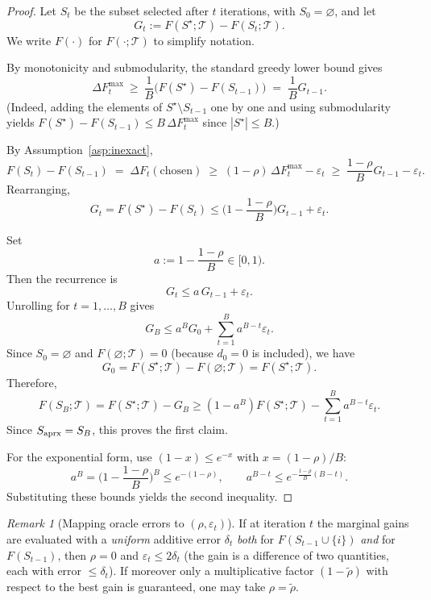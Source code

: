 \documentclass[accepted]{uai2026}
\theoremstyle{plain}
\theoremstyle{definition}
\theoremstyle{remark}
\newtheorem{remark}[theorem]{Remark}
\begin{document}
\begin{proof}
Let $S_t$ be the subset selected after $t$ iterations, with $S_0=\varnothing$, and let
\[
G_t := F(S^\star;\mathcal T)-F(S_t;\mathcal T).
\]
We write $F(\cdot)$ for $F(\cdot;\mathcal T)$ to simplify notation.

By monotonicity and submodularity, the standard greedy lower bound gives
\[
\Delta F_t^{\max}\ \ge\ \frac{1}{B}\big(F(S^\star)-F(S_{t-1})\big)
\;=\;\frac{1}{B}G_{t-1}.
\]
(Indeed, adding the elements of $S^\star\setminus S_{t-1}$ one by one and using submodularity yields
$F(S^\star)-F(S_{t-1})\le B\,\Delta F_t^{\max}$ since $|S^\star|\le B$.)

By Assumption~\ref{asp:inexact},
\[
F(S_t)-F(S_{t-1})
\;=\;\Delta F_t(\text{chosen})
\;\ge\; (1-\rho)\,\Delta F_t^{\max}-\varepsilon_t
\;\ge\; \frac{1-\rho}{B}G_{t-1}-\varepsilon_t.
\]
Rearranging,
\[
G_t
=F(S^\star)-F(S_t)
\le \Big(1-\frac{1-\rho}{B}\Big)G_{t-1}+\varepsilon_t.
\]

Set
\[
a:=1-\frac{1-\rho}{B}\in[0,1).
\]
Then the recurrence is
\[
G_t\le a\,G_{t-1}+\varepsilon_t.
\]
Unrolling for $t=1,\dots,B$ gives
\[
G_B\le a^B G_0+\sum_{t=1}^B a^{B-t}\varepsilon_t.
\]
Since $S_0=\varnothing$ and $F(\varnothing;\mathcal T)=0$ (because $d_0=0$ is included), we have
\[
G_0=F(S^\star;\mathcal T)-F(\varnothing;\mathcal T)=F(S^\star;\mathcal T).
\]
Therefore,
\[
F(S_B;\mathcal T)
=F(S^\star;\mathcal T)-G_B
\ge (1-a^B)F(S^\star;\mathcal T)-\sum_{t=1}^B a^{B-t}\varepsilon_t.
\]
Since $S_{\rm aprx}=S_B$, this proves the first claim.

For the exponential form, use $(1-x)\le e^{-x}$ with $x=(1-\rho)/B$:
\[
a^B=\Big(1-\frac{1-\rho}{B}\Big)^B\le e^{-(1-\rho)},
\qquad
a^{B-t}\le e^{-\frac{1-\rho}{B}(B-t)}.
\]
Substituting these bounds yields the second inequality.
\end{proof}

\begin{remark}[Mapping oracle errors to $(\rho,\varepsilon_t)$]\label{rmk:oracle-to-rhoeps}
If at iteration $t$ the marginal gains are evaluated with a \emph{uniform} additive error $\delta_t$
\emph{both} for $F(S_{t-1}\cup\{i\})$ \emph{and} for $F(S_{t-1})$, then $\rho=0$ and $\varepsilon_t\le 2\delta_t$
(the gain is a difference of two quantities, each with error $\le \delta_t$).
If moreover only a multiplicative factor $(1-\tilde\rho)$ with respect to the best gain is guaranteed,
one may take $\rho=\tilde\rho$.
\end{remark}
\end{document}
